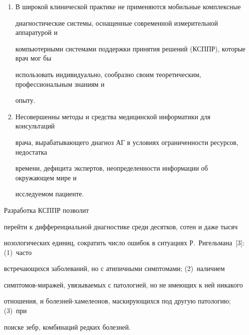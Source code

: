 \begin{enumerate}[1.]
и симптомов, форматов для регистрации данных, а также организацией записей для каждого


пациента индивидуально, заново, динамично. Поэтому не существует


 од\-но\-го-един\-ст\-вен\-но\-го, применимого в любой ситуации метода диагностики. Он


должен быть всякий раз предварительно синтезирован сообразно специфическим


характеристикам пациента, а затем уже применен с учетом имеющейся аппаратуры,


междисциплинарных знаний и опыта.


 \item В широкой клинической практике не применяются мобильные комплексные


диагностические системы, оснащенные современной измерительной аппаратурой и


компьютерными системами поддержки принятия решений (КСППР), которые врач мог бы


использовать индивидуально, сообразно своим теоретическим, профессиональным знаниям и


опыту.


 \item Несовершенны методы и средства медицинской информатики для консультаций


врача, вырабатывающего диагноз АГ в условиях ограниченности ресурсов, недостатка


времени, дефицита экспертов, неопределенности информации об окружающем мире и


исследуемом пациенте.


 \end{enumerate}





 Разработка КСППР позволит


перейти к дифференциальной диагностике среди десятков, сотен и даже тысяч


нозологических единиц, сократить число ошибок в ситуациях Р.~Ригельмана~[3]: (1)~часто


встречающихся заболеваний, но с атипичными симптомами; (2)~наличием


 симп\-то\-мов-ми\-ра\-жей, увязываемых с патологией, но не имеющих к ней никакого


отношения, и бо\-лез\-ней-ха\-ме\-лео\-нов, маскирующихся под другую патологию; (3)~при


поиске зебр, комбинаций редких болезней.





